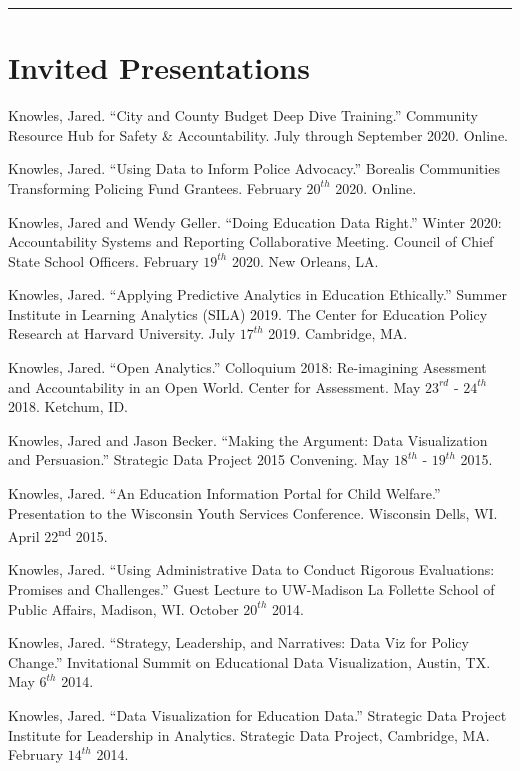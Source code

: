 \documentclass[margin,line]{res}
\begin{document}
\begin{resume}
\vspace*{1mm}
\noindent\hfil\rule{0.7\textwidth}{.4pt}\hfil
\vspace*{1mm}


\section{\sc Invited Presentations}

Knowles, Jared. ``City and County Budget Deep Dive Training.'' Community Resource 
Hub for Safety \& Accountability. July through September 2020. Online. 

Knowles, Jared. ``Using Data to Inform Police Advocacy.'' Borealis Communities 
Transforming Policing Fund Grantees. February $20^{th}$ 2020. Online. 

Knowles, Jared and Wendy Geller. ``Doing Education Data Right.'' Winter 2020: 
Accountability Systems and Reporting Collaborative Meeting. Council of Chief 
State School Officers. February $19^{th}$ 2020. New Orleans, LA.

Knowles, Jared. ``Applying Predictive Analytics in Education Ethically.'' Summer 
Institute in Learning Analytics (SILA) 2019. The Center for Education Policy 
Research at Harvard University. July $17^{th}$ 2019. Cambridge, MA.

Knowles, Jared. ``Open Analytics.'' Colloquium 2018: Re-imagining Asessment 
and Accountability in an Open World. Center for Assessment. May $23^{rd}$ - $24^{th}$ 2018. 
Ketchum, ID. 

Knowles, Jared and Jason Becker. ``Making the Argument: Data Visualization and 
Persuasion.'' Strategic Data Project 2015 Convening. May $18^{th}$ - $19^{th}$ 2015. 

Knowles, Jared. ``An Education Information Portal for Child Welfare.'' Presentation to the Wisconsin Youth Services Conference. Wisconsin Dells, WI. April 22\textsuperscript{nd} 2015.

Knowles, Jared. ``Using Administrative Data to Conduct Rigorous Evaluations: Promises and Challenges.'' Guest Lecture to UW-Madison La Follette School of Public Affairs, Madison, WI. October $20^{th}$ 2014.

Knowles, Jared. ``Strategy, Leadership, and Narratives: Data Viz for Policy Change.'' Invitational Summit on Educational Data Visualization, Austin, TX. May $6^{th}$ 2014. 

Knowles, Jared. ``Data Visualization for Education Data.'' Strategic Data Project Institute for Leadership in Analytics. Strategic Data Project, Cambridge, MA. February $14^{th}$ 2014. 


\end{resume}
\end{document}
